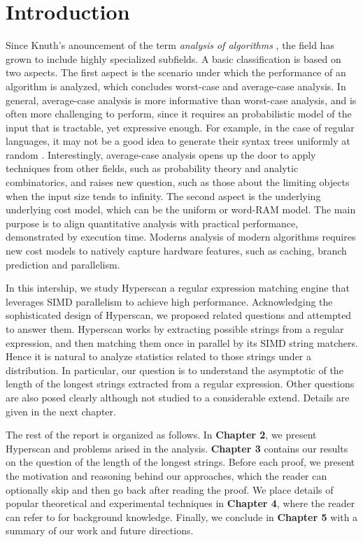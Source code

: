 \chapter{Introduction}



Since Knuth's anouncement of the term \textit{analysis of algorithms} \cite[Preface]{knuth1997art}, the field has grown to include highly specialized subfields. A basic classification is based on two aspects. The first aspect is the scenario under which the performance of an algorithm is analyzed, which concludes worst-case and average-case analysis. In general, average-case analysis is more informative than worst-case analysis, and is often more challenging to perform, since it requires an probabilistic model of the input that is tractable, yet expressive enough. For example, in the case of regular languages, it may not be a good idea to generate their syntax trees uniformly at random \cite{koechlin2019uniform}. Interestingly, average-case analysis opens up the door to apply techniques from other fields, such as probability theory and analytic combinatorics, and raises new question, such as those about the limiting objects when the input size tends to infinity. The second aspect is the underlying underlying cost model, which can be the uniform or word-RAM model. The main purpose is to align quantitative analysis with practical performance, demonstrated by execution time. Moderns analysis of modern algorithms requires new cost models to natively capture hardware features, such as caching, branch prediction and parallelism.

In this intership, we study Hyperscan a regular expression matching engine that leverages SIMD parallelism to achieve high performance. Acknowledging the sophisticated design of Hyperscan, we proposed related questions and attempted to answer them. Hyperscan works by extracting possible strings from a regular expression, and then matching them once in parallel by its SIMD string matchers. Hence it is natural to analyze statistics related to those strings under a distribution. In particular, our question is to understand the asymptotic of the length of the longest strings extracted from a regular expression. Other questions are also posed clearly although not studied to a considerable extend. Details are given in the next chapter.

The rest of the report is organized as follows. In \textbf{Chapter 2}, we present Hyperscan and problems arised in the analysis. \textbf{Chapter 3} contains our results on the question of the length of the longest strings. Before each proof, we present the motivation and reasoning behind our approaches, which the reader can optionally skip and then go back after reading the proof. We place details of popular theoretical and experimental techniques in \textbf{Chapter 4}, where the reader can refer to for background knowledge. Finally, we conclude in \textbf{Chapter 5} with a summary of our work and future directions.


